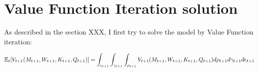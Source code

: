\section{Value Function Iteration solution}

As described in the section XXX, I first try to solve the model by Value Function iteration:

\begin{equation}
    \mathbb{E}_{t}[V_{t+1}(M_{t+1}, W_{t+1}, K_{t+1}, Q_{t+1})] = \int_{\epsilon_{t+1}} \int_{\gamma_{t+1}} \int_{\rho_{t+1}} V_{t+1} (M_{t+1}, W_{t+1}, K_{t+1}, Q_{t+1}) d\rho_{t+1} d \gamma_{t+1} d \epsilon_{t+1}
\end{equation}
